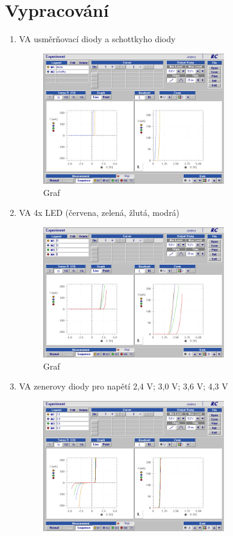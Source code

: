 \documentclass[a4paper]{article}
\begin{document}
\section*{Vypracování}
\begin{enumerate}
	\item VA usměrňovací diody a schottkyho diody
	\begin{figure}[H]
		\centering
		\includegraphics[width=0.75\textwidth]{12leden/1.png}
		\caption{Graf}
		\label{fig:mesh1}
	\end{figure}
	\item VA 4x LED (červena, zelená, žlutá, modrá)
	\begin{figure}[H]
		\centering
		\includegraphics[width=0.75\textwidth]{12leden/2.png}
		\caption{Graf }
		\label{fig:mesh2}
	\end{figure}
	\item VA zenerovy diody pro napětí  2,4 V; 3,0 V; 3,6 V; 4,3 V
	\begin{figure}[H]
		\centering
		\includegraphics[width=0.75\textwidth]{12leden/3.png}

\end{figure}
\end{enumerate}
\end{document}
